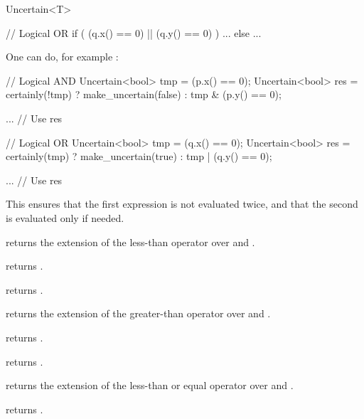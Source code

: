 \begin{ccRefClass}{Uncertain<T>}
\begin{ccExampleCode}
  // Logical OR
  if ( (q.x() == 0) || (q.y() == 0) )
    ...
  else
    ...
\end{ccExampleCode}

  One can do, for example :

\begin{ccExampleCode}
  // Logical AND
  Uncertain<bool> tmp = (p.x() == 0);
  Uncertain<bool> res = certainly(!tmp) ? make_uncertain(false) : tmp & (p.y() == 0);

  ... // Use res

  // Logical OR
  Uncertain<bool> tmp = (q.x() == 0);
  Uncertain<bool> res = certainly(tmp) ? make_uncertain(true) : tmp | (q.y() == 0);

  ... // Use res
\end{ccExampleCode}

  This ensures that the first expression is not evaluated twice, and that the second is
  evaluated only if needed.


  {returns the extension of the less-than operator over  and .}

  {returns .}

  {returns .}

  {returns the extension of the greater-than operator over  and .}

  {returns .}

  {returns .}

  {returns the extension of the less-than or equal operator over  and .}

  {returns .}


\end{ccRefClass}
